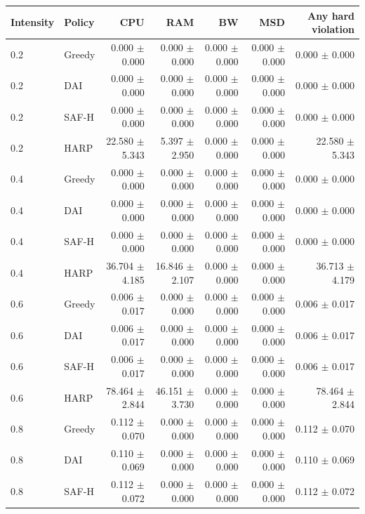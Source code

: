\begin{table}[p]
\centering
\color{revisiongreen}\small
\begin{tabular}{llrrrrr}
\toprule
Intensity & Policy & CPU & RAM & BW & MSD & Any hard violation \\
\midrule
0.2 & Greedy & 0.000 $\pm$ 0.000 & 0.000 $\pm$ 0.000 & 0.000 $\pm$ 0.000 & 0.000 $\pm$ 0.000 & 0.000 $\pm$ 0.000 \\
0.2 & DAI & 0.000 $\pm$ 0.000 & 0.000 $\pm$ 0.000 & 0.000 $\pm$ 0.000 & 0.000 $\pm$ 0.000 & 0.000 $\pm$ 0.000 \\
0.2 & SAF-H & 0.000 $\pm$ 0.000 & 0.000 $\pm$ 0.000 & 0.000 $\pm$ 0.000 & 0.000 $\pm$ 0.000 & 0.000 $\pm$ 0.000 \\
0.2 & HARP & 22.580 $\pm$ 5.343 & 5.397 $\pm$ 2.950 & 0.000 $\pm$ 0.000 & 0.000 $\pm$ 0.000 & 22.580 $\pm$ 5.343 \\
0.4 & Greedy & 0.000 $\pm$ 0.000 & 0.000 $\pm$ 0.000 & 0.000 $\pm$ 0.000 & 0.000 $\pm$ 0.000 & 0.000 $\pm$ 0.000 \\
0.4 & DAI & 0.000 $\pm$ 0.000 & 0.000 $\pm$ 0.000 & 0.000 $\pm$ 0.000 & 0.000 $\pm$ 0.000 & 0.000 $\pm$ 0.000 \\
0.4 & SAF-H & 0.000 $\pm$ 0.000 & 0.000 $\pm$ 0.000 & 0.000 $\pm$ 0.000 & 0.000 $\pm$ 0.000 & 0.000 $\pm$ 0.000 \\
0.4 & HARP & 36.704 $\pm$ 4.185 & 16.846 $\pm$ 2.107 & 0.000 $\pm$ 0.000 & 0.000 $\pm$ 0.000 & 36.713 $\pm$ 4.179 \\
0.6 & Greedy & 0.006 $\pm$ 0.017 & 0.000 $\pm$ 0.000 & 0.000 $\pm$ 0.000 & 0.000 $\pm$ 0.000 & 0.006 $\pm$ 0.017 \\
0.6 & DAI & 0.006 $\pm$ 0.017 & 0.000 $\pm$ 0.000 & 0.000 $\pm$ 0.000 & 0.000 $\pm$ 0.000 & 0.006 $\pm$ 0.017 \\
0.6 & SAF-H & 0.006 $\pm$ 0.017 & 0.000 $\pm$ 0.000 & 0.000 $\pm$ 0.000 & 0.000 $\pm$ 0.000 & 0.006 $\pm$ 0.017 \\
0.6 & HARP & 78.464 $\pm$ 2.844 & 46.151 $\pm$ 3.730 & 0.000 $\pm$ 0.000 & 0.000 $\pm$ 0.000 & 78.464 $\pm$ 2.844 \\
0.8 & Greedy & 0.112 $\pm$ 0.070 & 0.000 $\pm$ 0.000 & 0.000 $\pm$ 0.000 & 0.000 $\pm$ 0.000 & 0.112 $\pm$ 0.070 \\
0.8 & DAI & 0.110 $\pm$ 0.069 & 0.000 $\pm$ 0.000 & 0.000 $\pm$ 0.000 & 0.000 $\pm$ 0.000 & 0.110 $\pm$ 0.069 \\
0.8 & SAF-H & 0.112 $\pm$ 0.072 & 0.000 $\pm$ 0.000 & 0.000 $\pm$ 0.000 & 0.000 $\pm$ 0.000 & 0.112 $\pm$ 0.072 \\

\end{tabular}
\end{table}
